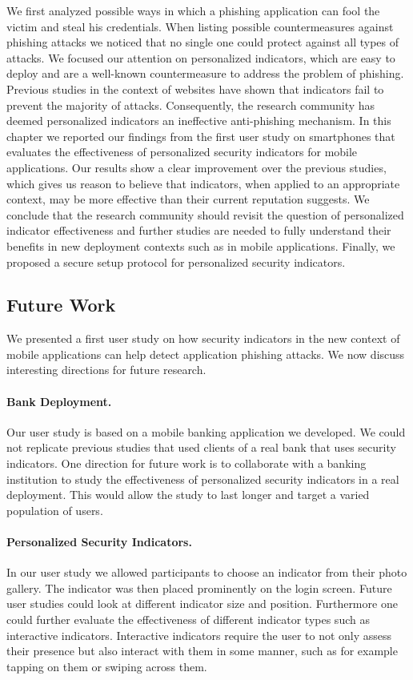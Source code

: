 We first analyzed possible ways in which a phishing application can fool the victim and steal his credentials. When listing possible countermeasures against phishing attacks we noticed that no single one could protect against all types of attacks. We focused our attention on personalized indicators, which are easy to deploy and are a well-known countermeasure to address the problem of phishing. Previous studies in the context of websites have shown that indicators fail to prevent the majority of attacks. Consequently, the research community has deemed personalized indicators an ineffective anti-phishing mechanism. In this chapter we reported our findings from the first user study on smartphones that evaluates the effectiveness of personalized security indicators for mobile applications. Our results show a clear improvement over the previous studies, which gives us reason to believe that indicators, when applied to an appropriate context, may be more effective than their current reputation suggests. We conclude that the research community should revisit the question of personalized indicator effectiveness and further studies are needed to fully understand their benefits in new deployment contexts such as in mobile applications. Finally, we proposed a secure setup protocol for personalized security indicators.

\subsection{Future Work}

We presented a first user study on how security indicators in the new context of mobile applications can help detect application phishing attacks. We now discuss interesting directions for future research.

\paragraph{Bank Deployment.} 
Our user study is based on a mobile banking application we developed. We could not replicate previous studies that used clients of a real bank that uses security indicators. One direction for future work is to collaborate with a banking institution to study the effectiveness of personalized security indicators in a real deployment. This would allow the study to last longer and target a varied population of users.

\paragraph{Personalized Security Indicators.}
In our user study we allowed participants to choose an indicator from their photo gallery. The indicator was then placed prominently on the login screen. Future user studies could look at different indicator size and position. Furthermore one could further evaluate the effectiveness of different indicator types such as interactive indicators. Interactive indicators require the user to not only assess their presence but also interact with them in some manner, such as for example tapping on them or swiping across them. 

